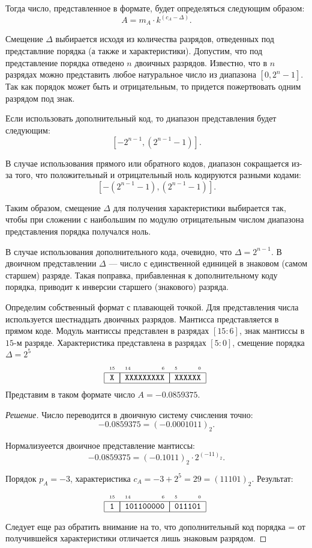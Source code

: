 Тогда число, представленное в формате, будет определяться следующим образом: 
\[
    A=m_A\cdot k^{(c_A - \Delta)}.
\]
    
Смещение $\Delta$ выбирается исходя из количества разрядов, отведенных под представлние порядка (а также и характеристики). Допустим, что под представление порядка отведено $n$ двоичных разрядов. Известно, что в $n$ разрядах можно представить любое натуральное число из диапазона $[0,2^n-1]$. Так как порядок может быть и отрицательным, то придется пожертвовать одним разрядом под знак. 

Если использовать дополнительный код, то диапазон представления будет следующим: 
\[
    [-2^{n-1},(2^{n-1}-1)].
\]

В случае использования прямого или обратного кодов, диапазон сокращается из-за того, что положительный и отрицательный ноль кодируются разными кодами:
\[
    [-(2^{n-1}-1),(2^{n-1}-1)].
\]

Таким образом, смещение $\Delta$ для получения характеристики выбирается так, чтобы при сложении с наибольшим по модулю отрицательным числом диапазона представления порядка получался ноль.

В случае использования дополнительного кода, очевидно, что $\Delta = 2^{n-1}$. В двоичном представлении $\Delta$ --- число с единственной единицей в знаковом (самом старшем) разряде. Такая поправка, прибавленная к дополнительному коду порядка, приводит к инверсии старшего (знакового) разряда.
\begin{Example}
    \label{ch:digitFormat:16char}
    Определим собственный формат с плавающей точкой. Для представления числа используется шестнадцать двоичных разрядов. Мантисса представляется в прямом коде. Модуль мантиссы представлен в разрядах $[15:6]$, знак мантиссы в $15$-м разряде. Характеристика представлена в разрядах $[5:0]$, смещение порядка $\Delta=2^5$
    \[
        \FloatMyCharHex{X}{XXXXXXXXX}{XXXXXX}
    \]
    Представим в таком формате число $A=-0.0859375$.
\end{Example}
\begin{proof}[Решение]
    Число переводится в двоичную систему счисления точно:
    \[-0.0859375 = (-0.0001011)_2.\]
    
    Нормализуеется двоичное представление мантиссы:
    \[-0.0859375 = (-0.1011)_2\cdot 2^{(-11)_2}.\]
    
    Порядок $p_A=-3$, характеристика $c_A={-3}+2^5=29=(11101)_2$.
    Результат:
    \[
        \FloatMyCharHex{1}{101100000}{011101}
    \]
    
    Следует еще раз обратить внимание на то, что дополнительный код порядка = от получившейся характеристики отличается лишь знаковым разрядом.
\end{proof}

